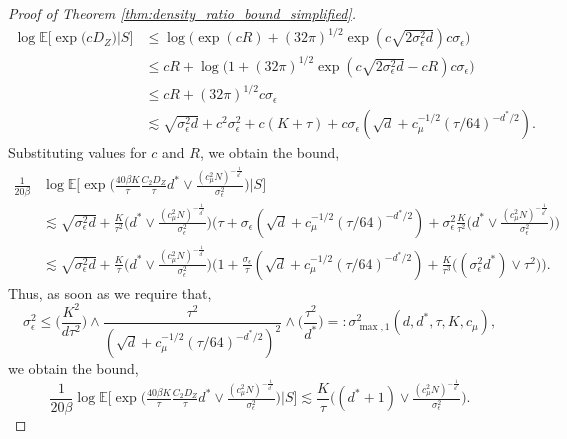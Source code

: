 \documentclass[10pt]{article}
\theoremstyle{plain}
\theoremstyle{definition}
\theoremstyle{remark}
\newcommand{\E}{\mathbb{E}}
\begin{document}
\begin{proof}[Proof of Theorem \ref{thm:density_ratio_bound_simplified}]
\begin{align*}
    \log \E \big [ \exp \big ( c D_Z \big ) \big | S \big ] &\leq \log \big ( \exp(cR) + (32 \pi)^{1/2} \exp(c \sqrt{2 \sigma_\epsilon^2 d}) c \sigma_\epsilon \big )\nonumber\\
    &\leq cR + \log \big (1 + (32 \pi)^{1/2} \exp(c \sqrt{2 \sigma_\epsilon^2 d} - cR) c \sigma_\epsilon \big )\nonumber\\
    &\leq cR + (32 \pi)^{1/2} c \sigma_\epsilon\nonumber\\
    &\lesssim \sqrt{\sigma_\epsilon^2 d} + c^2 \sigma_\epsilon^2 + c(K + \tau) + c \sigma_\epsilon (\sqrt{d} + c_\mu^{-1/2} (\tau/64)^{-d^*/2}).
\end{align*}
Substituting values for \(c\) and \(R\), we obtain the bound,
\begin{align}
    \frac{1}{20\beta} &\log \E \bigg [ \exp \bigg ( \tfrac{40\beta K}{\tau} \tfrac{C_2 D_Z}{\tau} d^* \vee \tfrac{(c_\mu^2 N)^{-\frac{1}{d^*}}}{\sigma_\epsilon^{2}} \bigg ) \bigg | S \bigg ]\nonumber\\
    &\lesssim \sqrt{\sigma_\epsilon^2 d} + \frac{K}{\tau^2} \bigg ( d^* \vee \tfrac{(c_\mu^2 N)^{-\frac{1}{d^*}}}{\sigma_\epsilon^{2}} \bigg ) \bigg ( \tau + \sigma_\epsilon (\sqrt{d} + c_\mu^{-1/2} (\tau/64)^{-d^*/2}) + \sigma_\epsilon^2 \frac{K}{\tau^2} \bigg ( d^* \vee \tfrac{(c_\mu^2 N)^{-\frac{1}{d^*}}}{\sigma_\epsilon^{2}} \bigg ) \bigg )\nonumber\\
    &\lesssim \sqrt{\sigma_\epsilon^2 d} + \frac{K}{\tau} \bigg ( d^* \vee \tfrac{(c_\mu^2 N)^{-\frac{1}{d^*}}}{\sigma_\epsilon^{2}} \bigg ) \bigg ( 1 + \frac{\sigma_\epsilon}{\tau} (\sqrt{d} + c_\mu^{-1/2} (\tau/64)^{-d^*/2}) + \frac{K}{\tau^3} \bigg ( (\sigma_\epsilon^2 d^*) \vee \tau^2 \bigg ) \bigg ).\label{eq:thm1_7}
\end{align}
Thus, as soon as we require that,
\begin{equation*}
    \sigma_\epsilon^2 \leq \Big ( \frac{K^2}{d\tau^2} \Big ) \wedge \frac{\tau^2}{(\sqrt{d} + c_\mu^{-1/2} (\tau/64)^{-d^*/2})^2} \wedge \Big ( \frac{\tau^2}{d^*} \Big ) =: \sigma_{\max, 1}^2(d, d^*, \tau, K, c_\mu),
\end{equation*}
we obtain the bound,
\begin{equation}\label{eq:thm1_4}
    \frac{1}{20\beta} \log \E \bigg [ \exp \bigg ( \tfrac{40\beta K}{\tau} \tfrac{C_2 D_Z}{\tau} d^* \vee \tfrac{(c_\mu^2 N)^{-\frac{1}{d^*}}}{\sigma_\epsilon^{2}} \bigg ) \bigg | S \bigg ] \lesssim \frac{K}{\tau} \bigg ( (d^* + 1) \vee \tfrac{(c_\mu^2 N)^{-\frac{1}{d^*}}}{\sigma_\epsilon^{2}} \bigg ).
\end{equation}


\end{proof}
\end{document}
